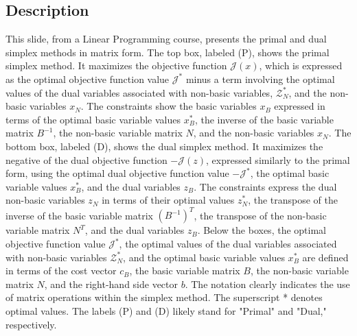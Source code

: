 \documentclass{article}%
\begin{document}
\subsection{Description}%
This slide, from a Linear Programming course, presents the primal and dual simplex methods in matrix form.  The top box, labeled (P), shows the primal simplex method. It maximizes the objective function $\mathcal{J}(x)$, which is expressed as the optimal objective function value $\mathcal{J}^*$ minus a term involving the optimal values of the dual variables associated with non-basic variables, $\mathcal{Z}_N^*$, and the non-basic variables $x_N$. The constraints show the basic variables $x_B$ expressed in terms of the optimal basic variable values $x_B^*$, the inverse of the basic variable matrix $B^{-1}$, the non-basic variable matrix $N$, and the non-basic variables $x_N$. The bottom box, labeled (D), shows the dual simplex method. It maximizes the negative of the dual objective function $-\mathcal{J}(z)$, expressed similarly to the primal form, using the optimal dual objective function value $-\mathcal{J}^*$, the optimal basic variable values $x_B^*$, and the dual variables $z_B$. The constraints express the dual non-basic variables $z_N$ in terms of their optimal values $z_N^*$, the transpose of the inverse of the basic variable matrix $(B^{-1})^T$, the transpose of the non-basic variable matrix $N^T$, and the dual variables $z_B$.  Below the boxes, the optimal objective function value $\mathcal{J}^*$, the optimal values of the dual variables associated with non-basic variables $\mathcal{Z}_N^*$, and the optimal basic variable values $x_B^*$ are defined in terms of the cost vector $c_B$, the basic variable matrix $B$, the non-basic variable matrix $N$, and the right-hand side vector $b$. The notation clearly indicates the use of matrix operations within the simplex method. The superscript * denotes optimal values. The labels (P) and (D) likely stand for "Primal" and "Dual," respectively.%
\end{document}
